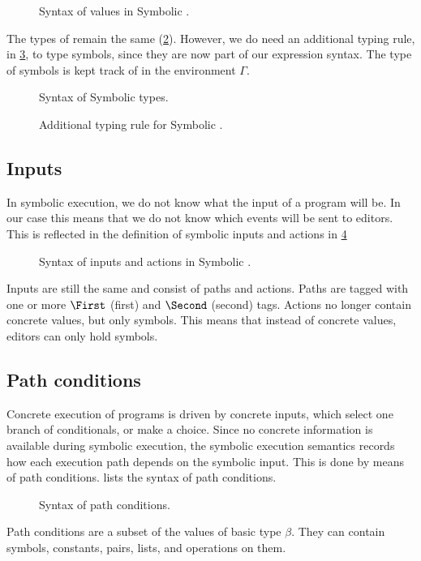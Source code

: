 \begin{figure}[ht]
  \small
  \caption{Syntax of values in Symbolic \TOPHAT.}
  \label{fig:syntaxvalues}
\end{figure}

The types of \STOPHAT remain the same (\cref{fig:syntaxtypes}).
However, we do need an additional typing rule,  in \cref{fig:typingsymbol}, to type symbols,
since they are now part of our expression syntax.
The type of symbols is kept track of in the environment $\Gamma$.

\begin{figure}[t]
  \small
  \caption{Syntax of Symbolic \TOPHAT types.}
  \label{fig:syntaxtypes}
\end{figure}

\begin{figure}[t]
  \small
  \caption{Additional typing rule for Symbolic \TOPHAT.}
  \label{fig:typingsymbol}
\end{figure}



\subsection{Inputs}

In symbolic execution, we do not know what the input of a program will be.
In our case this means that we do not know which events will be sent to editors.
This is reflected in the definition of symbolic inputs and actions in \cref{fig:syntaxinputs}

\begin{figure}[ht]
  \small
  \caption{Syntax of inputs and actions in Symbolic \TOPHAT.}
  \label{fig:syntaxinputs}
\end{figure}

Inputs are still the same and consist of paths and actions.
Paths are tagged with one or more $\First$ (first) and $\Second$ (second) tags.
Actions no longer contain concrete values, but only symbols.
This means that instead of concrete values, editors can only hold symbols.



\subsection{Path conditions}

Concrete execution of \TOPHAT programs is driven by concrete inputs, which select one branch of conditionals, or make a choice.
Since no concrete information is available during symbolic execution, the symbolic execution semantics records how each execution path depends on the symbolic input.
This is done by means of path conditions.
 lists the syntax of path conditions.

\begin{figure}[ht]
  \small
  \caption{Syntax of path conditions.}
  \label{fig:syntaxpredicates}
\end{figure}

Path conditions are a subset of the values of basic type $\beta$.
They can contain symbols, constants, pairs, lists, and operations on them.
